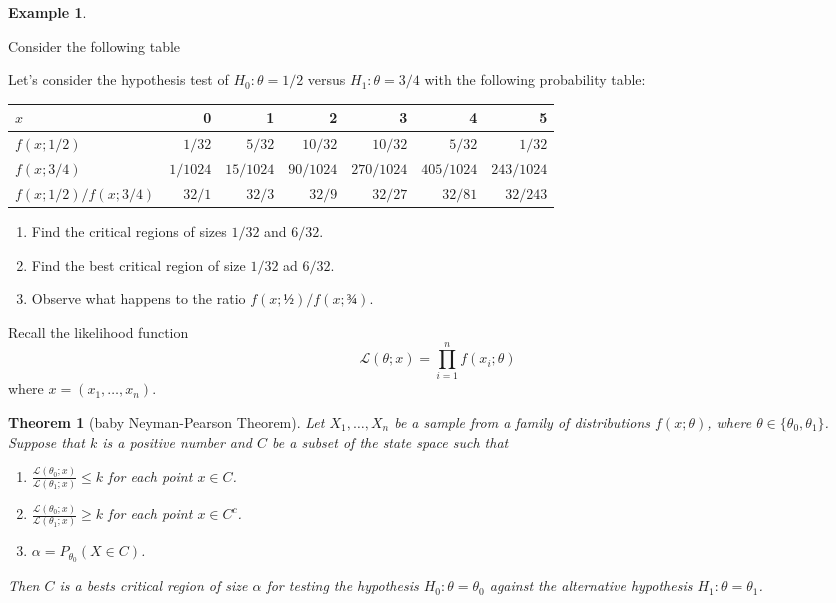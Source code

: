 \documentclass[
  openany]{book}
\providecommand{\tightlist}{%
  \setlength{\itemsep}{0pt}\setlength{\parskip}{0pt}}
\newtheorem{theorem}{Theorem}[chapter]
\theoremstyle{definition}
\theoremstyle{definition}
\newtheorem{example}{Example}[chapter]
\theoremstyle{definition}
\theoremstyle{definition}
\theoremstyle{remark}
\begin{document}
\begin{example}
\protect\hypertarget{exm:critical-region}{}\label{exm:critical-region}

Consider the following table

Let's consider the hypothesis test of \(H_0: \theta = 1/2\) versus
\(H_1: \theta = 3/4\)
with the following probability table:

\begin{longtable}[]{@{}lrrrrrr@{}}
\toprule
\(x\) & 0 & 1 & 2 & 3 & 4 & 5\tabularnewline
\midrule
\endhead
\(f(x ; 1 / 2)\) & \(1 / 32\) & \(5 / 32\) & \(10 / 32\) & \(10/32\) & \(5/32\) & \(1/32\)\tabularnewline
\(f(x ; 3 / 4)\) & \(1 / 1024\) & \(15 / 1024\) & \(90 / 1024\) & \(270/1024\) & \(405/1024\) & \(243/1024\)\tabularnewline
\(f(x ; 1 / 2) / f(x ; 3 / 4)\) & \(32 / 1\) & \(32 / 3\) & \(32 / 9\) & \(32/27\) & \(32/81\) & \(32/243\)\tabularnewline
\bottomrule
\end{longtable}

\begin{enumerate}
\def\labelenumi{\arabic{enumi}.}
\tightlist
\item
  Find the critical regions of sizes \(1/32\) and \(6/32\).
\item
  Find the best critical region of size \(1/32\) ad \(6/32\).
\item
  Observe what happens to the ratio \(f(x;½)/ f(x; ¾)\).
\end{enumerate}

\end{example}

Recall the likelihood function
\[\mathcal{L}(\theta;x) = \prod_{i=1}^n f(x_i;\theta)\]
where \(x = (x_1, \dots, x_n)\).

\begin{theorem}[baby Neyman-Pearson Theorem]
Let \(X_1, \dots, X_n\) be a sample from a family of distributions \(f(x;\theta)\),
where \(\theta \in \{\theta_0, \theta_1\}\).
Suppose that \(k\) is a positive number and \(C\) be a subset of the state space such that

\begin{enumerate}
\def\labelenumi{\alph{enumi}.}
\tightlist
\item
  \(\displaystyle{\frac{\mathcal{L}(\theta_0;x)}{\mathcal{L}(\theta_1;x)}} \leq k\) for each point \(x\in C\).
\item
  \(\displaystyle\frac{\mathcal{L}(\theta_0;x)}{\mathcal{L}(\theta_1;x)} \geq k\) for each point \(x\in C^c\).
\item
  \(\alpha = P_{\theta_0}(X \in C)\).
\end{enumerate}

Then \(C\) is a bests critical region of size \(\alpha\) for testing the hypothesis
\(H_0: \theta= \theta_0\) against the alternative hypothesis \(H_1: \theta = \theta_1\).
\end{theorem}
\end{document}
